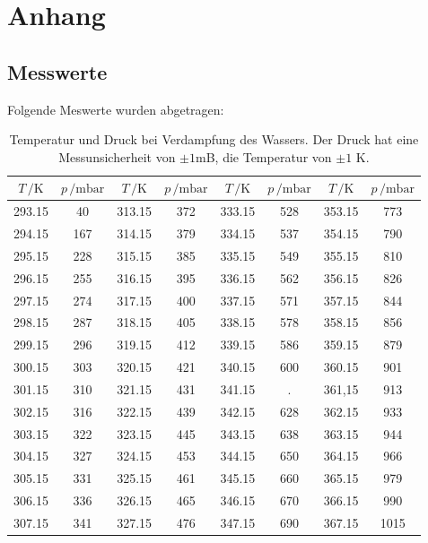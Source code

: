 \section{Anhang}
\subsection{Messwerte}
Folgende Meswerte wurden abgetragen:
\begin{table}[H]
    \centering
    \caption{Temperatur und Druck bei Verdampfung des Wassers. Der Druck hat eine Messunsicherheit von
    $\pm1$mB, die Temperatur von $\pm 1$ K.}
    \label{tab:Messreihe_1}
  \begin{tabular}{
    c c||c c||c c||c c
  }
  \toprule 
  $T\,/ \unit{\kelvin}$ & $p\,/ \text{mbar}$ & $T\,/ \unit{\kelvin}$ & $p\,/ \text{mbar}$&
  $T\,/ \unit{\kelvin}$ & $p\,/ \text{mbar}$ & $T\,/ \unit{\kelvin}$ & $p\,/ \text{mbar}$\\
  \midrule
  293.15  & 40   & 313.15  & 372  & 333.15  & 528  & 353.15  & 773 \\
  294.15  & 167  & 314.15  & 379  & 334.15  & 537  & 354.15  & 790 \\
  295.15  & 228  & 315.15  & 385  & 335.15  & 549  & 355.15  & 810 \\
  296.15  & 255  & 316.15  & 395  & 336.15  & 562  & 356.15  & 826 \\
  297.15  & 274  & 317.15  & 400  & 337.15  & 571  & 357.15  & 844 \\
  298.15  & 287  & 318.15  & 405  & 338.15  & 578  & 358.15  & 856 \\
  299.15  & 296  & 319.15  & 412  & 339.15  & 586  & 359.15  & 879 \\
  300.15  & 303  & 320.15  & 421  & 340.15  & 600  & 360.15  & 901 \\
  301.15  & 310  & 321.15  & 431  & 341.15  & \text{--} .& 361,15  & 913 \\
  302.15  & 316  & 322.15  & 439  & 342.15  & 628  & 362.15  & 933 \\
  303.15  & 322  & 323.15  & 445  & 343.15  & 638  & 363.15  & 944 \\
  304.15  & 327  & 324.15  & 453  & 344.15  & 650  & 364.15  & 966 \\
  305.15  & 331  & 325.15  & 461  & 345.15  & 660  & 365.15  & 979 \\
  306.15  & 336  & 326.15  & 465  & 346.15  & 670  & 366.15  & 990 \\
  307.15  & 341  & 327.15  & 476  & 347.15  & 690  & 367.15  & 1015\\

\end{tabular}
\end{table}
